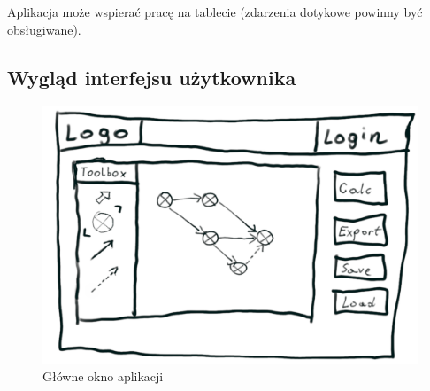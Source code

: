 Aplikacja może wspierać pracę na tablecie (zdarzenia dotykowe powinny być obsługiwane).

\subsection{Wygląd interfejsu użytkownika}
\begin{figure}[h]
	\centering
	\includegraphics[width=0.9\linewidth]{main-window}
	\caption[Główne okno aplikacji]{Główne okno aplikacji}
	\label{fig:main-window}
\end{figure}
